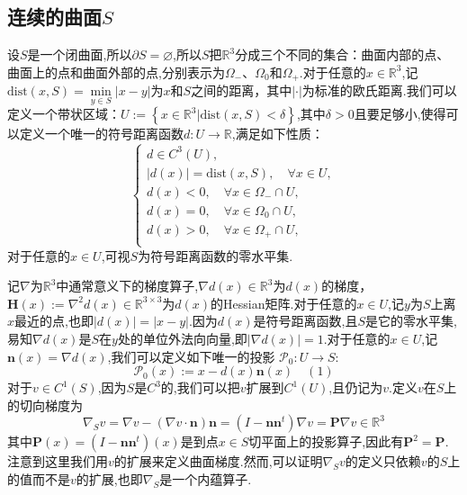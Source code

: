 \documentclass{article}
\begin{document}
\subsection{连续的曲面$S$}
设$S$是一个闭曲面,所以$\partial S=\varnothing$,所以$S$把$\mathbb{R}^3$分成三个不同的集合：曲面内部的点、曲面上的点和曲面外部的点,分别表示为$\Omega_{-}$、$\Omega_0$和$\Omega_{+}$.对于任意的$x\in\mathbb{R}^3$,记$\mathrm{dist}(x,S)=\min\limits_{y\in S}\left|x-y\right|$为$x$和$S$之间的距离，其中$|\cdot|$为标准的欧氏距离.我们可以定义一个带状区域：$U:=\left\{x\in\mathbb{R}^3|\mathrm{dist}(x,S)<\delta\right\}$,其中$\delta>0$且要足够小,使得可以定义一个唯一的符号距离函数$d:U\rightarrow\mathbb{R}$,满足如下性质：
\begin{equation}\label{eq:MA}
\left\{
\begin{array}{l}
d\in C^3(U),\\
|d(x)|=\mathrm{dist}(x,S),\quad \forall x\in U,\\
d(x)< 0,\quad\forall x\in\Omega_{-}\cap U,\\
d(x)= 0,\quad\forall x\in \Omega_0\cap U,\\
d(x)> 0,\quad\forall x\in\Omega_{+}\cap U,\\
\end{array}\right.
\end{equation}
对于任意的$x\in U$,可视$S$为符号距离函数的零水平集.

记$\nabla$为$\mathbb{R}^3$中通常意义下的梯度算子,$\nabla d(x)\in\mathbb{R}^3$为$d(x)$的梯度，$\boldsymbol{H}(x):=\nabla^2d(x)\in\mathbb{R}^{3\times 3}$为$d(x)$的Hessian矩阵.对于任意的$x\in U$,记$y$为$S$上离$x$最近的点,也即$|d(x)|=\left|x-y\right|$.因为$d(x)$是符号距离函数,且$S$是它的零水平集,易知$\nabla d(x)$是$S$在$y$处的单位外法向向量,即$\left|\nabla d(x)\right|=1$.对于任意的$x\in U$,记$\boldsymbol{n}(x)=\nabla d(x)$,我们可以定义如下唯一的投影
$\mathcal{P}_0:U\rightarrow S$:
\begin{equation*}
\mathcal{P}_0(x):=x-d(x)\boldsymbol{n}(x)\quad(1)
\end{equation*}
对于$v\in C^1(S)$,因为$S$是$C^3$的,我们可以把$v$扩展到$C^1(U)$,且仍记为$v$.定义$v$在$S$上的切向梯度为
\begin{equation*}
\nabla_Sv=\nabla v-(\nabla v\cdot\boldsymbol{n})\boldsymbol{n}=(I-\boldsymbol{n}\boldsymbol{n}^t)\nabla v=\boldsymbol{P}\nabla v\in\mathbb{R}^3
\end{equation*}
其中$\boldsymbol{P}(x)=(I-\boldsymbol{n}\boldsymbol{n}^t)(x)$是到点$x\in S$切平面上的投影算子,因此有$\boldsymbol{P}^2=\boldsymbol{P}$.注意到这里我们用$v$的扩展来定义曲面梯度.然而,可以证明$\nabla_Sv$的定义只依赖$v$的$S$上的值而不是$v$的扩展,也即$\nabla_S$是一个内蕴算子.
\end{document}
